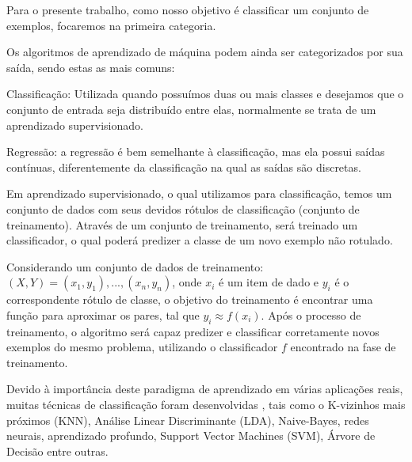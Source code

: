 \documentclass[
12pt,        %
oneside,     %
a4paper,     %
english,       %
brazil        %
%
%
]{ppgca}
\begin{document}
Para o presente trabalho, como nosso objetivo é classificar um conjunto de exemplos, focaremos na primeira categoria.

Os algoritmos de aprendizado de máquina podem ainda ser categorizados por sua saída, sendo estas as mais comuns:

Classificação: Utilizada quando possuímos duas ou mais classes e desejamos que o conjunto de entrada seja distribuído entre elas, normalmente se trata de um aprendizado supervisionado.

Regressão: a regressão é bem semelhante à classificação, mas ela possui saídas contínuas, diferentemente da classificação na qual as saídas são discretas.

Em aprendizado supervisionado, o qual utilizamos para classificação, temos um conjunto de dados com seus devidos rótulos de classificação (conjunto de treinamento). Através de um conjunto de treinamento, será treinado um classificador, o qual poderá predizer a classe de um novo exemplo não rotulado.

Considerando um conjunto de dados de treinamento: $(X, Y) = {(x_1, y_1), ...,(x_n, y_n)}$, onde $x_i$ é um item de dado e $y_i$ é o correspondente rótulo de classe, o objetivo do treinamento é encontrar uma função para aproximar os pares, tal que $y_i \approx f(x_i)$. Após o processo de treinamento, o algoritmo será capaz predizer e classificar corretamente novos exemplos do mesmo problema, utilizando o classificador $f$ encontrado na fase de treinamento.

Devido à importância deste paradigma de aprendizado em várias aplicações reais, muitas técnicas de classificação foram desenvolvidas \cite{Alpaydin2009, Goodfellow2016, Haykin1998, Vapnik2008}, tais como o K-vizinhos mais próximos (KNN), Análise Linear Discriminante (LDA), Naive-Bayes, redes neurais, aprendizado profundo, Support Vector Machines (SVM), Árvore de Decisão entre outras.
\end{document}
